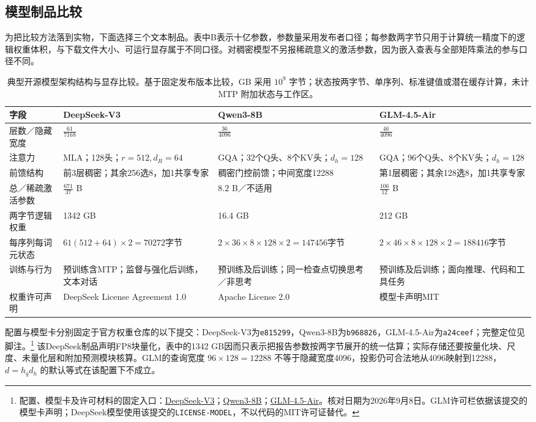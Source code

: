 \documentclass[../textbook.tex]{subfiles}
\begin{document}
\subsection{模型制品比较}
\label{sec:open-fixed-comparison}
为把比较方法落到实物，下面选择三个文本制品。表中B表示十亿参数，参数量采用发布者口径；每参数两字节只用于计算统一精度下的逻辑权重体积，与下载文件大小、可运行显存属于不同口径。对稠密模型不另报稀疏意义的激活参数，因为嵌入查表与全部矩阵乘法的参与口径不同。

\begin{table}[htbp]
\centering
\small
\caption[典型开源模型架构结构与显存比较]{典型开源模型架构结构与显存比较。基于固定发布版本比较，GB 采用 $10^9$ 字节；状态按两字节、单序列、标准键值或潜在缓存计算，未计 MTP 附加状态与工作区。}\label{tab:open-actual-comparison}
\begin{tabularx}{\linewidth}{p{29mm}XXX}
\toprule 字段 & DeepSeek-V3 & Qwen3-8B & GLM-4.5-Air\\\midrule
层数／隐藏宽度 & $\frac{61}{7168}$ & $\frac{36}{4096}$ & $\frac{46}{4096}$\\
注意力 & MLA；128头；$r=512,d_R=64$ & GQA；32个Q头、8个KV头；$d_h=128$ & GQA；96个Q头、8个KV头；$d_h=128$\\
前馈结构 & 前3层稠密；其余256选8，加1共享专家 & 稠密门控前馈；中间宽度12288 & 第1层稠密；其余128选8，加1共享专家\\
总／稀疏激活参数 & $\frac{671}{37}$ B & $8.2$ B／不适用 & $\frac{106}{12}$ B\\
两字节逻辑权重 & 1342 GB & 16.4 GB & 212 GB\\
每序列每词元状态 & $61(512+64)\times2=70272$字节 & $2\times36\times8\times128\times2=147456$字节 & $2\times46\times8\times128\times2=188416$字节\\
训练与行为 & 预训练含MTP；监督与强化后训练，文本对话 & 预训练及后训练；同一检查点切换思考／非思考 & 预训练及后训练；面向推理、代码和工具任务\\
权重许可声明 & DeepSeek License Agreement 1.0 & Apache License 2.0 & 模型卡声明MIT\\
\bottomrule
\end{tabularx}
\end{table}

配置与模型卡分别固定于官方权重仓库的以下提交：DeepSeek-V3为\texttt{e815299}，Qwen3-8B为\texttt{b968826}，GLM-4.5-Air为\texttt{a24ceef}；完整定位见脚注。\footnote{配置、模型卡及许可材料的固定入口：\href{https://huggingface.co/deepseek-ai/DeepSeek-V3/tree/e815299b0bcbac849fa540c768ef21845365c9eb}{DeepSeek-V3}；\href{https://huggingface.co/Qwen/Qwen3-8B/tree/b968826d9c46dd6066d109eabc6255188de91218}{Qwen3-8B}；\href{https://huggingface.co/zai-org/GLM-4.5-Air/tree/a24ceef6ce4f3536971efe9b778bdaa1bab18daa}{GLM-4.5-Air}。核对日期为2026年9月8日。GLM许可栏依据该提交的模型卡声明；DeepSeek模型使用该提交的\texttt{LICENSE-MODEL}，不以代码的MIT许可证替代。}
该DeepSeek制品声明FP8块量化，表中的1342 GB因而只表示把报告参数按两字节展开的统一估算；实际存储还要按量化块、尺度、未量化层和附加预测模块核算。GLM的查询宽度 $96\times128=12288$ 不等于隐藏宽度4096，投影仍可合法地从4096映射到12288，$d=h_qd_h$ 的默认等式在该配置下不成立。
\end{document}
